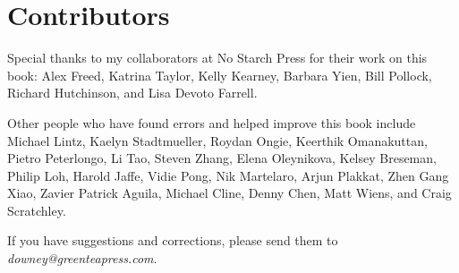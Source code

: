 \chapter*{Contributors}
\adjustmtc

Special thanks to my collaborators at No Starch Press for their work on this book: Alex Freed, Katrina Taylor, Kelly Kearney, Barbara Yien, Bill Pollock, Richard Hutchinson, and Lisa Devoto Farrell.

Other people who have found errors and helped improve this book include
Michael Lintz,
Kaelyn Stadtmueller,
Roydan Ongie,
Keerthik Omanakuttan,
Pietro Peterlongo,
Li Tao,
Steven Zhang,
Elena Oleynikova,
Kelsey Breseman,
Philip Loh,
Harold Jaffe,
Vidie Pong,
Nik Martelaro,
Arjun Plakkat,
Zhen Gang Xiao,
Zavier Patrick Aguila,
Michael Cline,
Denny Chen,
Matt Wiens,
and Craig Scratchley.

If you have suggestions and corrections, please send them to \emph{downey@greenteapress.com}.